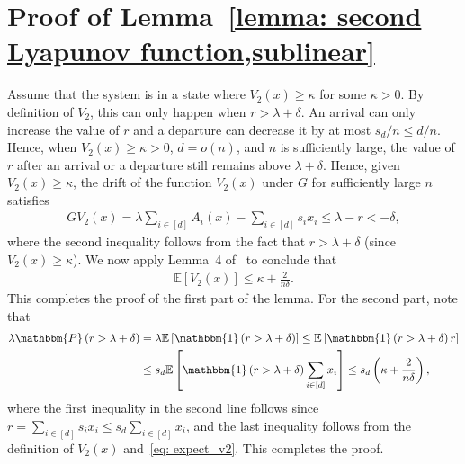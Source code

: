 \documentclass[a4paper]{article}
\def\ind{\mathbbm{1}}
\theoremstyle{plain}
\theoremstyle{definition}
\theoremstyle{case}
\theoremstyle{remark}
\newcommand{\brac}[1]{\left(#1\right)}
\newcommand{\sbrac}[1]{\left[#1\right]}
\newcommand{\expect}[1]{\mathbb{E}\sbrac{#1}}
\begin{document}
\section{Proof of Lemma~\ref{lemma: second Lyapunov function,sublinear}}


Assume that the system is in a state where $V_2(x)  \geq \kappa$ for some $\kappa>0$. By definition of $V_2$, this can only happen when $r > \lambda+\delta$. An arrival can only increase the value of $r$ and a departure can decrease it by at most $s_d/n \leq d/n$. Hence, when $V_2(x)  \geq \kappa > 0$, $d=o(n)$, and $n$ is sufficiently large, the value of $r$ after an arrival or a departure  still remains above $\lambda+\delta$.
%
Hence, given $V_2(x)  \geq \kappa$, the drift of the function $V_2(x)$ under $G$ for sufficiently large $n$ satisfies
\begin{align}
    GV_2(x) = \lambda \sum_{i \in [d]} A_i(x)  - \sum_{i \in [d]} s_ix_i
     \leq  \lambda - r 
    < -\delta,
\end{align}
where the second inequality follows from the fact that $r > \lambda +\delta$ (since $V_2(x)  \geq \kappa$). %
We now apply Lemma~4 of~\cite{lei_ying_2020_Stein} %
to conclude that
\begin{align} \label{eq: expect_v2}
     \expect{V_2(x)} \leq  \kappa+\frac{2}{ n\delta}.
\end{align}
This completes the proof of the first part of the lemma. For the second part, note that
\begin{align*}
   \lambda \mathbbm{P}\brac{r > \lambda + \delta}  &=  \lambda \expect{\ind \brac{r > \lambda + \delta}}
  \leq \expect{\ind \brac{r > \lambda + \delta} r} 
   \nonumber\\& \leq s_d \expect{\ind \brac{r > \lambda + \delta} \sum_{i \in [d]}x_i}
   \leq  s_d\brac{\kappa+\frac{2}{ n\delta}},
\end{align*}
%
where the first inequality in the second line follows since $r = \sum_{i \in [d]} s_i x_i \leq s_d \sum_{i\in[d]} x_i$, and the last inequality follows from the definition of $V_2(x)$ and~\eqref{eq: expect_v2}. This completes the proof.
\end{document}
